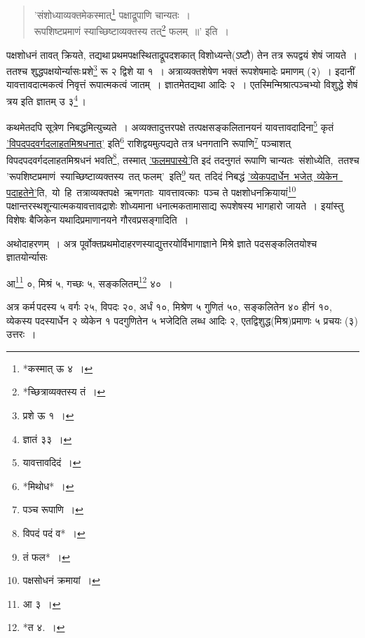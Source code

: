\documentclass[10pt, openany]{book}
\begin{document}
{{{{{{{\begin{quote}
{\qt 'संशोध्याव्यक्तमेकस्मात्\renewcommand{\thefootnote}{१}\footnote{*कस्मात् ऊ ४~।} पक्षाद्रूपाणि चान्यतः~।\\
 रूपशिष्टप्रमाणं स्याच्छिष्टाव्यक्तस्य तत्\renewcommand{\thefootnote}{२}\footnote{*च्छित्राव्यक्तस्य तं~।}  फलम्~॥'} {इति~।}\end{quote}

 {पक्षशोधनं तावत् क्रियते, तद्यथा\textendash \,प्रथमपक्षस्थिताद्रूपदशकात्
विशोध्यन्ते(ऽष्टौ)}
{तेन तत्र रूपद्वयं शेषं जायते~। ततश्च शुद्धपक्षयोर्न्यासः\textendash \,प्रशे\renewcommand{\thefootnote}{३}\footnote{प्रशे ऊ १~।} 
रू २ द्विशे या १~। अत्राव्यक्तशेषेण भक्तं रूपशेषमादेः प्रमाणम् (२)~। इदानीं यावत्तावदात्मकत्वं
निवृत्तं रूपात्मकत्वं}
{जातम्~। ज्ञातमेतद्यथा आदिः २~। एतस्मिन्मिश्रात्पञ्चभ्यो विशुद्धे शेषं
त्रय इति ज्ञातम् उ ३\renewcommand{\thefootnote}{४}\footnote{ज्ञातं ३३~।}\,।}
\vspace{3mm}

{कथमेतदपि सूत्रेण निबद्धमित्युच्यते~। अव्यक्तादुत्तरपक्षे
तत्पक्षसङ्कलितानयनं यावत्तावदादिना\renewcommand{\thefootnote}{५}\footnote{यावत्तावदिदं~।}  कृतं \hyperref[88]{'विपदपदवर्गदलाहतमिश्रधनात्'} इति\renewcommand{\thefootnote}{६}\footnote{*मिथोध*~।}  राशिद्वयमुत्पद्यते
तत्र धनगतानि रूपाणि\renewcommand{\thefootnote}{७}\footnote{पञ्च रूपाणि~।}}
{पञ्चाशत् विपदपदवर्गदलाहतमिश्रधनं भवति\renewcommand{\thefootnote}{८}\footnote{विपदं पदं व*~।}, तस्मात् \hyperref[88]{'फलमपास्ये'}ति इदं
तदनुगतं रूपाणि}
{चान्यतः \,संशोध्येति, \,ततश्च {\qt 'रूपशिष्टप्रमाणं \,स्याच्छिष्टाव्यक्तस्य \,तत् फलम्'} \,इति\renewcommand{\thefootnote}{९}\footnote{तं फल*~।} यत् \,तदिदं}
{निबद्धं \hyperref[88]{'व्येकपदार्धेन \,भजेत् \,व्येकेन \,पदाहतेने'}ति, \,यो \,हि \,तत्राव्यक्तपक्षे \,ऋणगताः \,यावत्तावत्काः \,पञ्च ते पक्षशोधनक्रियायां\renewcommand{\thefootnote}{१०}\footnote{पक्षसोधनं क्रमायां~।} पक्षान्तरस्थशून्यात्मकयावत्तावद्राशेः
शोध्यमाना धनात्मकतामासाद्य रूपशेषस्य भागहारो जायते~। इयांस्तु विशेषः बैजिकेन
यथादिप्रमाणानयने गौरवप्रसङ्गादिति~।}
\vspace{3mm}

{अथोदाहरणम्~। अत्र पूर्वोक्तप्रथमोदाहरणस्याद्युत्तरयोर्विभागाज्ञाने
मिश्रे ज्ञाते पदसङ्कलितयोश्च ज्ञातयोर्न्यासः\textemdash}
\vspace{2mm}

\hspace{2cm}आ\renewcommand{\thefootnote}{११}\footnote{आ ३\textemdash~।}  ०, मिश्रं ५, गच्छः ५, सङ्कलितम्\renewcommand{\thefootnote}{१२}\footnote{*त ४.~।}  ४०~। \vspace{3mm}

{अत्र कर्म\textendash \,पदस्य ५ वर्गः २५, विपदः २०, अर्धं १०, मिश्रेण ५ गुणितं ५०,}
{सङ्कलितेन ४० हीनं १०, व्येकस्य पदस्यार्धेन २ व्येकेन १ पदगुणितेन ५
भजेदिति लब्ध}
{आदिः २, एतद्विशुद्ध(मिश्र)प्रमाणः ५ प्रचयः (३) उत्तरः~।}
\vspace{3mm}

}}}}}}}
\end{document}
